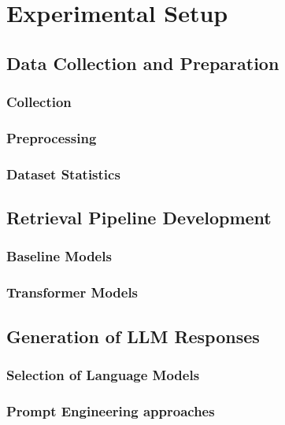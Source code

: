 \chapter{Experimental Setup}


\section{Data Collection and Preparation}

\subsection{Collection}

\subsection{Preprocessing}

\subsection{Dataset Statistics}


\section{Retrieval Pipeline Development}

\subsection{Baseline Models}

\subsection{Transformer Models}

\section{Generation of LLM Responses}


\subsection{Selection of Language Models}

\subsection{Prompt Engineering approaches}
